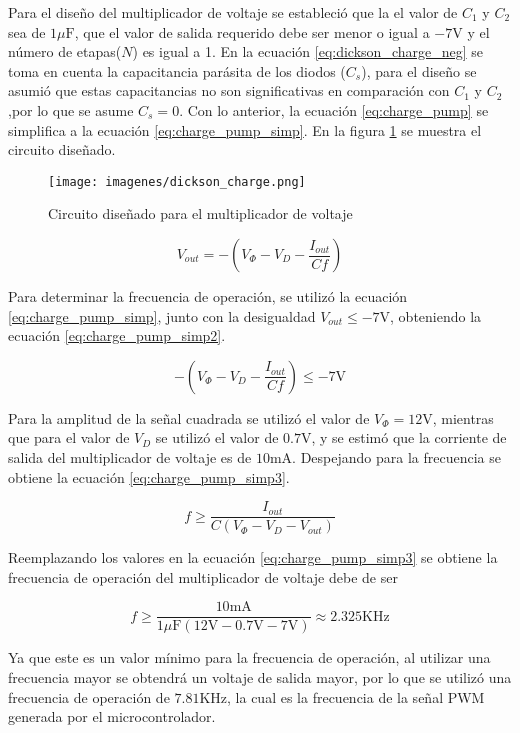     Para el diseño del multiplicador de voltaje se estableció que la 
    el valor de $C_1$ y $C_2$ sea de
    $1\mu\text{F}$, que el valor de salida requerido debe ser menor o igual
    a $-7\text{V}$ y el número de etapas($N$) es igual a 1. En la 
    ecuación \ref{eq:dickson_charge_neg}  se toma en cuenta la
    capacitancia parásita de los diodos ($C_s$), para el diseño se asumió
    que estas capacitancias no son significativas en comparación con 
    $C_1$ y $C_2$,por lo que se asume $C_s = 0$.
    Con lo anterior, la ecuación \ref{eq:charge_pump} se simplifica a la
    ecuación \ref{eq:charge_pump_simp}. En la figura \ref{fig:charge_pump_dis}
    se muestra el circuito diseñado.

    \begin{figure}[H]
        \centering
        \texttt{[image: imagenes/dickson\_charge.png]}
        \caption{Circuito diseñado para el multiplicador de voltaje}
        \label{fig:charge_pump_dis}
    \end{figure}

    \begin{equation}
        V_{out} = -\left(V_\Phi - V_D - \frac{I_{out}}{Cf}  \right)
        \label{eq:charge_pump_simp}
    \end{equation}

    Para determinar la frecuencia de operación, se utilizó la ecuación 
    \ref{eq:charge_pump_simp}, junto con la desigualdad 
    $V_{out} \leq -7\text{V}$, obteniendo la ecuación 
    \ref{eq:charge_pump_simp2}.

    \begin{equation}
        -\left(V_\Phi - V_D - \frac{I_{out}}{Cf}\right) \leq -7\text{V}
        \label{eq:charge_pump_simp2}    
    \end{equation}

    Para la amplitud de la señal cuadrada se utilizó el valor de 
    $V_\Phi = 12 \text{V}$, mientras que para 
    el valor de $V_D$ se utilizó el valor de $0.7\text{V}$, y se estimó que
    la corriente de salida del multiplicador de voltaje es de $10\text{mA}$.
    Despejando para la frecuencia se obtiene la ecuación \ref{eq:charge_pump_simp3}.

    \begin{equation}
        f \geq \frac{I_{out}}{C(V_\Phi - V_D - V_{out})}
        \label{eq:charge_pump_simp3}
    \end{equation}

    Reemplazando los valores en la ecuación \ref{eq:charge_pump_simp3} se obtiene
    la frecuencia de operación del multiplicador de voltaje debe de ser 

        $$
            f \geq \frac{10\text{mA}}{1\mu\text{F}(12\text{V} - 0.7\text{V}
             - 7\text{V})} \approx 2.325\text{KHz}
        $$

    Ya que este es un valor mínimo para la frecuencia de operación, al utilizar
    una frecuencia mayor se obtendrá un voltaje de salida mayor, por lo que se
    utilizó una frecuencia de operación de $7.81\text{KHz}$, la cual es la
    frecuencia de la señal PWM generada por el microcontrolador. 
